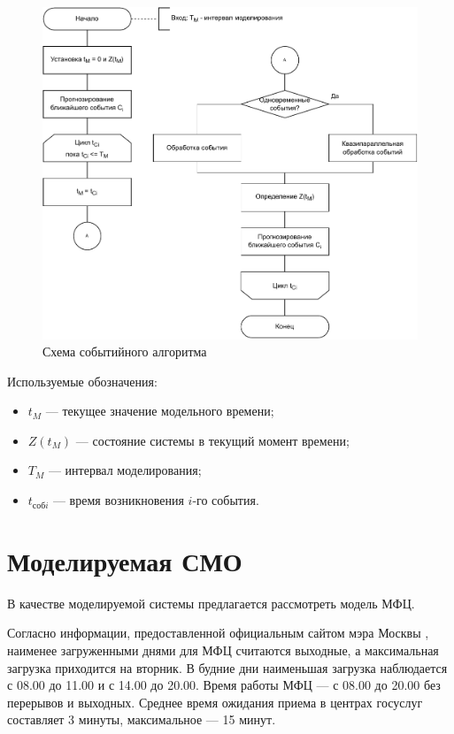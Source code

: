 \begin{figure}[h!btp]
	\centering
	\includegraphics[width=1\columnwidth]{inc/img/delta_z_schema.pdf}
	\caption{Схема событийного алгоритма}
	\label{img:delta_z_schema}	
\end{figure}

Используемые обозначения:
\begin{itemize}
	\item $t_M$ --- текущее значение модельного времени;
	\item $Z(t_M)$ --- состояние системы в текущий момент времени;
	\item $T_M$ --- интервал моделирования;
	\item $t_{соб i}$ --- время возникновения $i$-го события.
\end{itemize}

\section{Моделируемая СМО}
В качестве моделируемой системы предлагается рассмотреть модель МФЦ.

Согласно информации, предоставленной официальным сайтом мэра Москвы \cite{mos_ru}, наименее загруженными днями для МФЦ считаются выходные, а максимальная загрузка приходится на вторник. В будние дни наименьшая загрузка наблюдается с 08.00 до 11.00 и с 14.00 до 20.00. Время работы МФЦ --- с 08.00 до 20.00 без перерывов и выходных. Среднее время ожидания приема в центрах госуслуг составляет 3 минуты, максимальное --- 15 минут.

